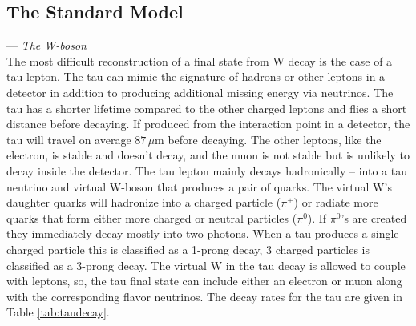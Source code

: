 
\subsection{The Standard Model}
\label{subsec:std_model}


--- \textit{The W-boson }\\
  The most difficult reconstruction of a final state from W decay is the case of a tau lepton. The tau can mimic the signature of hadrons or other leptons in a detector in addition to producing additional missing energy via neutrinos. The tau has a shorter lifetime compared to the other charged leptons and flies a short distance before decaying. If produced from the interaction point in a detector, the tau will travel on average $87\,\mu\text{m}$ before decaying. The other leptons, like the electron, is stable and doesn't decay, and the muon is not stable but is unlikely to decay inside the detector. The tau lepton mainly decays hadronically -- into a tau neutrino and virtual W-boson that produces a pair of quarks. The virtual W's daughter quarks will hadronize into a charged particle ($\pi^\pm$) or radiate more quarks that form either more charged or neutral particles ($\pi^0$). If $\pi^0$'s are created they immediately decay mostly into two photons. When a tau produces a single charged particle this is classified as a 1-prong decay, 3 charged particles is classified as a 3-prong decay. The virtual W in the tau decay is allowed to couple with leptons, so, the tau final state can include either an electron or muon along with the corresponding flavor neutrinos. The decay rates for the tau are given in Table \ref{tab:taudecay}.

